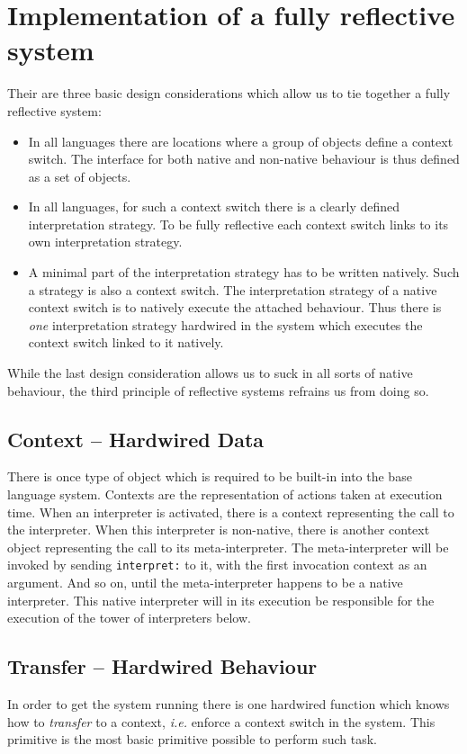 \documentclass{article}
\newcommand{\ie}{\emph{i.e.}\xspace}
\begin{document}
\section{Implementation of a fully reflective system}
Their are three basic design considerations which allow us to tie
together a fully reflective system:

\begin{itemize}
    \item In all languages there are locations where a group of
          objects define a context switch. The interface for both
          native and non-native behaviour is thus defined as a set of
          objects.
    \item In all languages, for such a context switch there is a
          clearly defined interpretation strategy. To be fully
          reflective each context switch links to its own
          interpretation strategy.
    \item A minimal part of the interpretation strategy has to be
          written natively. Such a strategy is also a context switch.
          The interpretation strategy of a native context switch is to
          natively execute the attached behaviour. Thus there is
          \emph{one} interpretation strategy hardwired in the system
          which executes the context switch linked to it natively.
\end{itemize}

While the last design consideration allows us to suck in all sorts of
native behaviour, the third principle of reflective systems refrains us
from doing so. 

\subsection{Context -- Hardwired Data}
There is once type of object which is required to be built-in into the base
language system. Contexts are the representation of actions taken at
execution time. When an interpreter is activated, there is a context
representing the call to the interpreter. When this interpreter is non-native,
there is another context object representing the call to its meta-interpreter.
The meta-interpreter will be invoked by sending \verb$interpret:$ to it, with
the first invocation context as an argument. And so on, until the
meta-interpreter happens to be a native interpreter. This native interpreter
will in its execution be responsible for the execution of the tower of
interpreters below.

\subsection{Transfer -- Hardwired Behaviour}
In order to get the system running there is one hardwired
function which knows how to \emph{transfer} to a context, \ie enforce
a context switch in the system. This primitive is the most
basic primitive possible to perform such task.
\end{document}
